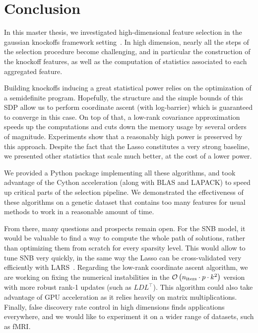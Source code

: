 \cleardoublepage
\chapter*{Conclusion}

In this master thesis,
we investigated high-dimensional feature selection
in the gaussian knockoffs framework setting~\citep{model_x_knockoffs}.
In high dimension, nearly all the steps of the selection procedure become challenging,
and in particular the construction of the knockoff features,
as well as the computation of statistics associated to each aggregated feature.

Building knockoffs inducing a great statistical power relies on the optimization of a semidefinite program.
Hopefully, the structure and the simple bounds of this SDP allow us
to perform coordinate ascent (with log-barrier) which is guaranteed to converge in this case.
On top of that, a low-rank covariance approximation speeds up the computations
and cuts down the memory usage by several orders of magnitude.
Experiments show that a reasonably high power is preserved by this approach.
Despite the fact that the Lasso constitutes a very strong baseline,
we presented other statistics that scale much better,
at the cost of a lower power.

We provided a Python package implementing all these algorithms,
and took advantage of the Cython acceleration (along with BLAS and LAPACK)
to speed up critical parts of the selection pipeline.
We demonstrated the effectiveness of these algorithms on a genetic dataset that contains too many features
for usual methods to work in a reasonable amount of time.

From there, many questions and prospects remain open.
For the SNB model,
it would be valuable to find a way to compute the whole path of solutions,
rather than optimizing them from scratch for every sparsity level.
This would allow to tune SNB very quickly,
in the same way the Lasso can be cross-validated very efficiently with LARS~\citep{lars}.
Regarding the low-rank coordinate ascent algorithm,
we are working on fixing the numerical instabilities in the
$\mathcal{O}\left( n_\text{iters} \cdot p \cdot k^2 \right)$ version with more robust rank-1 updates
(such as $LDL^\top$).
This algorithm could also take advantage of GPU acceleration
as it relies heavily on matrix multiplications.
Finally, false discovery rate control in high dimensions finds applications everywhere,
and we would like to experiment it on a wider range of datasets,
such as fMRI\@.
